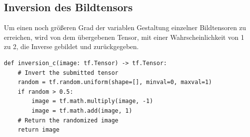 \subsection{Inversion des Bildtensors}

Um einen noch größeren Grad der variablen Gestaltung einzelner Bildtensoren zu erreichen, wird von dem übergebenen Tensor, mit einer Wahrscheinlichkeit von 1 zu 2, die Inverse gebildet und zurückgegeben. 

\vspace*{10mm}

\begin{lstlisting}[caption={Python Funktion zum zufälligen Rotieren des Bildtensors}]
	def inversion_c(image: tf.Tensor) -> tf.Tensor:
  	# Invert the submitted tensor
    random = tf.random.uniform(shape=[], minval=0, maxval=1)
    if random > 0.5:
        image = tf.math.multiply(image, -1)
        image = tf.math.add(image, 1)
    # Return the randomized image
    return image
\end{lstlisting}



